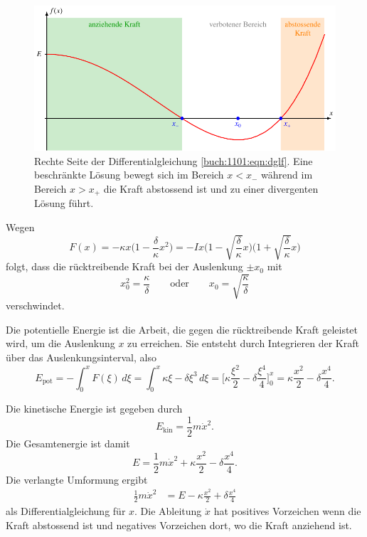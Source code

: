 \begin{loesung}
\begin{figure}
\centering
\includegraphics{chapters/110-elliptisch/uebungsaufgaben/anharmonisch.pdf}
\caption{Rechte Seite der Differentialgleichung
\eqref{buch:1101:eqn:dglf}. 
Eine beschränkte Lösung bewegt sich im Bereich $x<x_-$
während im Bereich $x>x_+$ die Kraft abstossend ist und zu einer
divergenten Lösung führt.
\label{buch:1101:fig:potential}
}
\end{figure}
\begin{teilaufgaben}
\item
Wegen
\[
F(x)
=
-\kappa x\biggl(1-\frac{\delta}{\kappa}x^2\biggr)
=
-Ix
\biggl(1-\sqrt{\frac{\delta}{\kappa}}x\biggr)
\biggl(1+\sqrt{\frac{\delta}{\kappa}}x\biggr)
\]
folgt, dass die rücktreibende Kraft bei der Auslenkung  $\pm x_0$ mit
\[
x_0^2
=
\frac{\kappa}{\delta}
\qquad\text{oder}\qquad
x_0 = \sqrt{\frac{\kappa}{\delta}}
\]
verschwindet.
\item
Die potentielle Energie ist die Arbeit, die gegen die rücktreibende Kraft
geleistet wird, um die Auslenkung $x$ zu erreichen.
Sie entsteht durch Integrieren der Kraft über
das Auslenkungsinterval, also
\[
E_{\text{pot}}
=
-
\int_0^x F(\xi) \,d\xi
=
\int_0^x \kappa\xi-\delta\xi^3\,d\xi
=
\biggl[
\kappa\frac{\xi^2}{2}
-
\delta
\frac{\xi^4}{4}
\biggr]_0^x
=
\kappa\frac{x^2}{2}
-
\delta\frac{x^4}{4}.
\]
\item
Die kinetische Energie ist gegeben durch
\[
E_{\text{kin}}
=
\frac12m\dot{x}^2.
\]
Die Gesamtenergie ist damit
\[
E
=
\frac12m\dot{x}^2
+
\kappa
\frac{x^2}{2}
-
\delta
\frac{x^4}{4}.
\]
Die verlangte Umformung ergibt
\begin{align}
\frac12m\dot{x}^2
&=
E
-
\kappa\frac{x^2}{2}
+
\delta\frac{x^4}{4}
\label{buch:1101:eqn:dglf}
\end{align}
als Differentialgleichung für $x$.
Die Ableitung $\dot{x}$ hat positives Vorzeichen wenn die Kraft
abstossend ist und negatives Vorzeichen dort, wo die Kraft anziehend ist.

\end{teilaufgaben}
\end{loesung}
